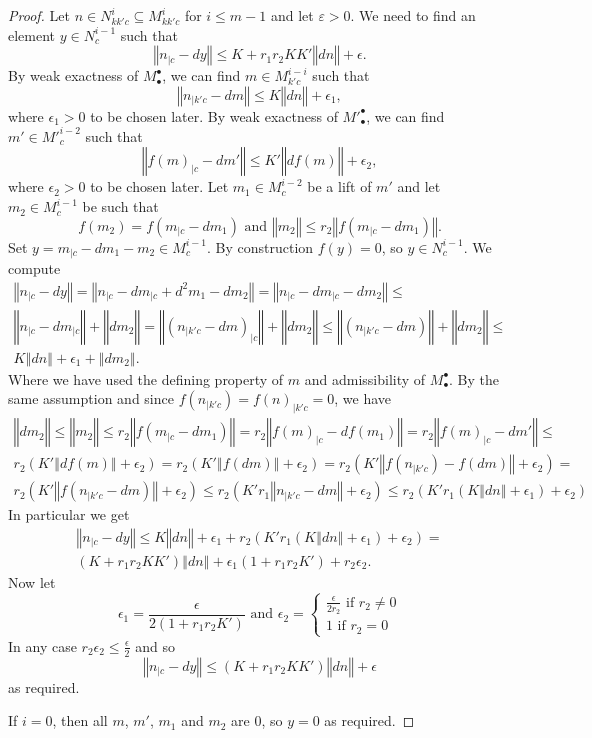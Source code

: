 \begin{proof}
\leanok
Let $n \in N^i_{kk'c} \subseteq M^i_{kk'c}$ for $i\leq m-1$ and let $ε > 0$. We need to find an element $y \in N^{i-1}_c$ such that
\[
  ‖n_{|c} - dy‖ \leq K + r_1r_2KK'‖dn‖ + \epsilon.
\]
By weak exactness of $M^\bullet_\bullet$, we can find $m \in M^{i-i}_{k'c}$ such that
\[
  ‖n_{|k'c} - dm‖ \leq K‖dn‖ + \epsilon_1,
\]
where $\epsilon_1 > 0$ to be chosen later. By weak exactness of $M'^\bullet_\bullet$, we can find $m' \in M'^{i-2}_c$ such that
\[
  ‖f(m)_{|c} - dm'‖ \leq K'‖df(m)‖ + \epsilon_2,
\]
where $\epsilon_2 > 0$ to be chosen later. Let $m_1 \in M^{i-2}_c$ be a lift of $m'$ and let $m_2 \in M^{i-1}_c$ be such that
\[
f(m_2) = f(m_{|c} - dm_1) \mbox{ and } ‖m_2‖ \leq r_2 ‖f(m_{|c} - dm_1)‖.
\]
Set $y = m_{|c} - dm_1 - m_2 \in M^{i-1}_c$. By construction $f(y) = 0$, so $y \in N^{i-1}_c$. We compute
\begin{gather*}
‖n_{|c} - dy‖ = ‖n_{|c} - dm_{|c} + d^2m_1 - dm_2‖ = ‖n_{|c} - dm_{|c} - dm_2‖ \leq \\
‖n_{|c} - dm_{|c} ‖ + ‖dm_2‖ = ‖(n_{|k'c} - dm)_{|c}‖ + ‖dm_2‖ \leq ‖(n_{|k'c} - dm)‖ + ‖dm_2‖ \leq \\
K‖dn‖ + \epsilon_1 + ‖dm_2‖.
\end{gather*}
Where we have used the defining property of $m$ and admissibility of $M^\bullet_\bullet$. By the same assumption and since $f(n_{|k'c}) = f(n)_{|k'c} = 0$, we have
\begin{gather*}
‖dm_2‖ \leq ‖m_2‖ \leq  r_2 ‖f(m_{|c} - dm_1)‖ = r_2 ‖f(m)_{|c} - df(m_1)‖ = r_2 ‖f(m)_{|c} - dm'‖ \leq \\
r_2(K'‖df(m)‖ + \epsilon_2) = r_2(K'‖f(dm)‖ + \epsilon_2) = r_2(K'‖f(n_{|k'c}) - f(dm)‖ + \epsilon_2) = \\
r_2(K'‖f(n_{|k'c} - dm)‖ + \epsilon_2) \leq r_2(K'r_1‖n_{|k'c} - dm‖ + \epsilon_2) \leq r_2(K'r_1(K‖dn‖ + \epsilon_1) + \epsilon_2)
\end{gather*}
In particular we get
\begin{gather*}
‖n_{|c} - dy‖ \leq K‖dn‖ + \epsilon_1 + r_2(K'r_1(K‖dn‖ + \epsilon_1) + \epsilon_2) =
\\(K + r_1r_2KK')‖dn‖ + \epsilon_1(1+r_1r_2K') + r_2\epsilon_2.
\end{gather*}
Now let
\[
\epsilon_1 = \frac{\epsilon}{2(1+r_1r_2K')} \mbox{ and } \epsilon_2 = \begin{cases}
                                                                    \frac{\epsilon}{2r_2} \mbox{ if } r_2 \neq 0 \\
                                                                    1 \mbox{ if } r_2 = 0
                                                                      \end{cases}
\]
In any case $r_2 \epsilon_2 \leq \frac{\epsilon}{2}$ and so
\[
‖n_{|c} - dy‖ \leq (K + r_1r_2KK')‖dn‖ + \epsilon
\]
as required.

If $i=0$, then all $m$, $m'$, $m_1$ and $m_2$ are $0$, so $y=0$ as required.
\end{proof}

